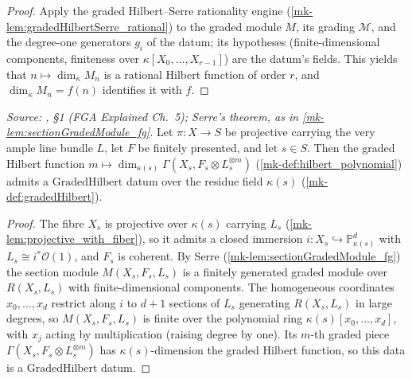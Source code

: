 \begin{proof}
  \leanok
  Apply the graded Hilbert--Serre rationality engine
  (\ref{mk-lem:gradedHilbertSerre_rational}) to the graded module \(M\), its
  grading \(\mathcal{M}\), and the degree-one generators \(g_i\) of the datum;
  its hypotheses (finite-dimensional components, finiteness over
  \(\kappa[X_0,\dots,X_{r-1}]\)) are the datum's fields.  This yields that
  \(n \mapsto \dim_\kappa M_n\) is a rational Hilbert function of order \(r\), and
  \(\dim_\kappa M_n = f(n)\) identifies it with \(f\).
\end{proof}

\begin{lemma}
  \label{mk-lem:gradedHilbert_fiber}
  \leanok

  \textit{Source: \cite{nitsure-hilbert-quot}, \S 1 (FGA Explained Ch.~5); Serre's theorem, as in
  \ref{mk-lem:sectionGradedModule_fg}.}
  Let \(\pi : X \to S\) be projective carrying the very ample line bundle \(L\),
  let \(F\) be finitely presented, and let \(s \in S\).  Then the graded Hilbert
  function \(m \mapsto \dim_{\kappa(s)} \Gamma(X_s, F_s \otimes L_s^{\otimes m})\)
  (\ref{mk-def:hilbert_polynomial}) admits a \(\mathrm{GradedHilbert}\) datum over
  the residue field \(\kappa(s)\) (\ref{mk-def:gradedHilbert}).

\end{lemma}

\begin{proof}
  The fibre \(X_s\) is projective over \(\kappa(s)\) carrying \(L_s\)
  (\ref{mk-lem:projective_with_fiber}), so it admits a closed immersion
  \(i : X_s \hookrightarrow \mathbb{P}^d_{\kappa(s)}\) with
  \(L_s \cong i^*\mathcal{O}(1)\), and \(F_s\) is coherent.  By Serre
  (\ref{mk-lem:sectionGradedModule_fg}) the section module \(M(X_s, F_s, L_s)\) is
  a finitely generated graded module over \(R(X_s, L_s)\) with
  finite-dimensional components.  The homogeneous coordinates \(x_0, \dots, x_d\)
  restrict along \(i\) to \(d+1\) sections of \(L_s\) generating \(R(X_s, L_s)\)
  in large degrees, so \(M(X_s, F_s, L_s)\) is finite over the polynomial ring
  \(\kappa(s)[x_0, \dots, x_d]\), with \(x_j\) acting by multiplication (raising
  degree by one).  Its \(m\)-th graded piece \(\Gamma(X_s, F_s \otimes
  L_s^{\otimes m})\) has \(\kappa(s)\)-dimension the graded Hilbert function, so
  this data is a \(\mathrm{GradedHilbert}\) datum.
\end{proof}

